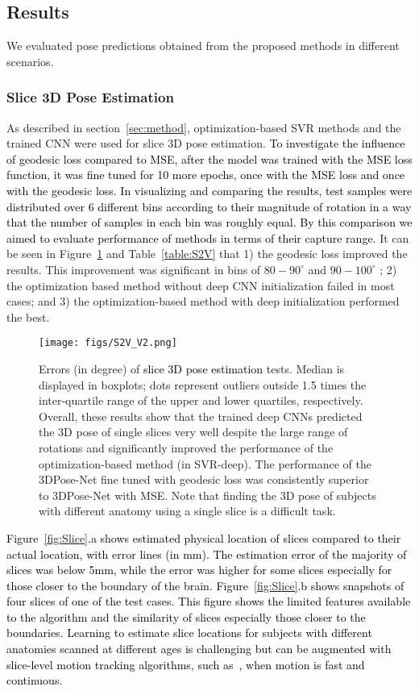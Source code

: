 \documentclass[journal,transmag]{IEEEtran}
\begin{document}
\subsection{Results}
We evaluated pose predictions obtained from the proposed methods in different scenarios. 
\subsubsection{Slice 3D Pose Estimation}
As described in section~\ref{sec:method}, optimization-based SVR methods and the trained CNN were used for slice 3D pose estimation. \textcolor{black}{To investigate the influence of geodesic loss compared to MSE, after the model was trained with the MSE loss function, it was fine tuned for 10 more epochs, once with the MSE loss and once with the geodesic loss. In visualizing and comparing the results, test samples were distributed over 6 different bins according to their magnitude of rotation in a way that the number of samples in each bin was roughly equal. By this comparison we aimed to evaluate performance of methods in terms of their capture range.} It can be seen in Figure~\ref{fig:S2V} and Table~\ref{table:S2V} that 1) the geodesic loss improved the results. This improvement was significant in bins of $80-90^\circ$ and $90-100^\circ$ ; 2) the optimization based method without deep CNN initialization failed in most cases; and 3) the optimization-based method with deep initialization performed the best.

\begin{figure}
    \centering
    \texttt{[image: figs/S2V\_V2.png]}
    \caption{Errors (in degree) of \textcolor{black}{slice 3D pose estimation} tests. Median is displayed in boxplots; dots represent outliers outside 1.5 times the inter-quartile range of the upper and lower quartiles, respectively. Overall, these results show that the trained deep CNNs predicted the 3D pose of single slices very well despite the large range of rotations and significantly improved the performance of the optimization-based method (in SVR-deep). The performance of the 3DPose-Net fine tuned with geodesic loss was consistently superior to 3DPose-Net with MSE. Note that finding the 3D pose of subjects with different anatomy using a single slice is a difficult task.}
    \label{fig:S2V}
\end{figure}

\textcolor{black}{Figure~\ref{fig:Slice}.a shows estimated physical location of slices compared to their actual location, with error lines (in mm). The estimation error of the majority of slices was below 5mm, while the error was higher for some slices especially for those closer to the boundary of the brain. Figure~\ref{fig:Slice}.b shows snapshots of four slices of one of the test cases. This figure shows the limited features available to the algorithm and the similarity of slices especially those closer to the boundaries. Learning to estimate slice locations for subjects with different anatomies scanned at different ages is challenging but can be augmented with slice-level motion tracking algorithms, such as~\cite{marami2017temporal}, when motion is fast and continuous.}  
\end{document}
